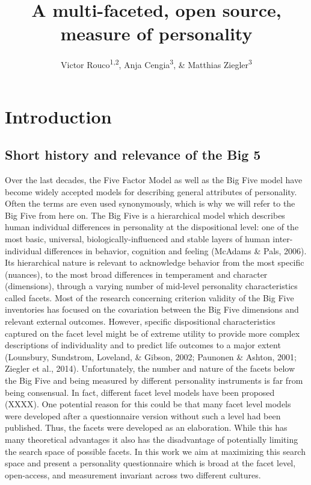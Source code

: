 \documentclass[man]{apa6}
\title{A multi-faceted, open source, measure of personality}
\author{Victor Rouco\textsuperscript{1,2}, Anja Cengia\textsuperscript{3}, \& Matthias Ziegler\textsuperscript{3}}
\affiliation{
    \vspace{0.5cm}
          \textsuperscript{1} Universitat de Barcelona\\
          \textsuperscript{2} Institut de Neurociencies Barcelona\\
          \textsuperscript{3} Humboldt Universität zu Berlin  }
\theoremstyle{definition}
\theoremstyle{definition}
\theoremstyle{definition}
\theoremstyle{remark}
\begin{document}
\maketitle

\setcounter{secnumdepth}{0}



\hypertarget{introduction}{%
\section{Introduction}\label{introduction}}

\hypertarget{short-history-and-relevance-of-the-big-5}{%
\subsection{Short history and relevance of the Big
5}\label{short-history-and-relevance-of-the-big-5}}

Over the last decades, the Five Factor Model as well as the Big Five
model have become widely accepted models for describing general
attributes of personality. Often the terms are even used synonymously,
which is why we will refer to the Big Five from here on. The Big Five is
a hierarchical model which describes human individual differences in
personality at the dispositional level: one of the most basic,
universal, biologically-influenced and stable layers of human
inter-individual differences in behavior, cognition and feeling (McAdams
\& Pals, 2006). Its hierarchical nature is relevant to acknowledge
behavior from the most specific (nuances), to the most broad differences
in temperament and character (dimensions), through a varying number of
mid-level personality characteristics called facets. Most of the
research concerning criterion validity of the Big Five inventories has
focused on the covariation between the Big Five dimensions and relevant
external outcomes. However, specific dispositional characteristics
captured on the facet level might be of extreme utility to provide more
complex descriptions of individuality and to predict life outcomes to a
major extent (Lounsbury, Sundstrom, Loveland, \& Gibson, 2002; Paunonen
\& Ashton, 2001; Ziegler et al., 2014). Unfortunately, the number and
nature of the facets below the Big Five and being measured by different
personality instruments is far from being consensual. In fact, different
facet level models have been proposed (XXXX). One potential reason for
this could be that many facet level models were developed after a
questionnaire version without such a level had been published. Thus, the
facets were developed as an elaboration. While this has many theoretical
advantages it also has the disadvantage of potentially limiting the
search space of possible facets. In this work we aim at maximizing this
search space and present a personality questionnaire which is broad at
the facet level, open-access, and measurement invariant across two
different cultures.
\end{document}
